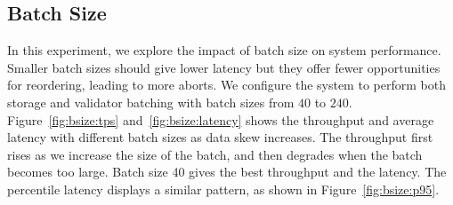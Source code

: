 \subsection{Batch Size}
In this experiment, we explore the impact of batch size on system performance. 
Smaller batch sizes should give lower latency but they offer fewer opportunities for reordering, leading to more aborts. 
We configure the system to perform both storage and validator batching with batch sizes from $40$ to $240$.
Figure~\ref{fig:bsize:tps} and~\ref{fig:bsize:latency} shows the throughput and average latency with different batch sizes as data skew increases. The throughput first rises as we increase the size of the batch, and then degrades when the batch becomes too large. Batch size 40 gives the best throughput and the latency. The percentile latency displays a similar pattern, as shown in Figure~\ref{fig:bsize:p95}.

